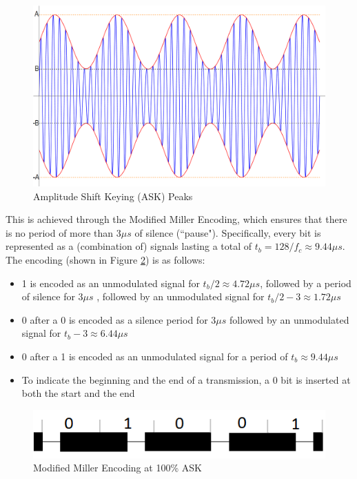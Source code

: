 \documentclass[fleqn,10pt]{SelfArx} %
\newcommand{\ms}{\ensuremath{\mu s} }
\begin{document}
\begin{figure}[tp]
  \includegraphics[width=\linewidth]{img/ask}
  \caption{Amplitude Shift Keying (ASK) Peaks}
  \label{fig:ask}
\end{figure}

This is achieved through the Modified Miller Encoding, which ensures that there is no period of more than 3\ms of silence (``pause"). Specifically, every bit is represented as a (combination of) signals lasting a total of $t_b=128/f_c\approx9.44\ms$. The encoding (shown in Figure \ref{fig:miller}) is as follows:
\begin{itemize}[noitemsep] 
\item 1 is encoded as an unmodulated signal for $t_b/2\approx 4.72 \ms$, followed by a period of silence for 3\ms, followed by an unmodulated signal for $t_b/2-3\approx 1.72\ms$
\item 0 after a 0 is encoded as a silence period for 3\ms followed by an unmodulated signal for $t_b-3\approx 6.44\ms$
\item 0 after a 1 is encoded as an unmodulated signal for a period of $t_b\approx9.44\ms$
\item To indicate the beginning and the end of a transmission, a 0 bit is inserted at both the start and the end
\end{itemize}

\begin{figure}[tp]
  \includegraphics[width=\linewidth]{img/miller}
  \caption{Modified Miller Encoding at 100\% ASK}
  \label{fig:miller}
\end{figure}
\end{document}
